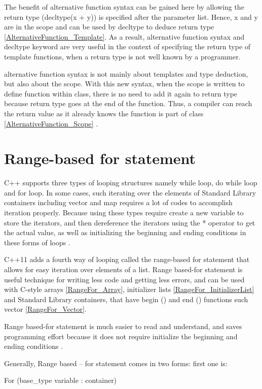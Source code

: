 \documentclass[11pt]{report}
\begin{document}
The benefit of alternative function syntax can be gained here by allowing the return type (decltype(x + y)) is specified after the parameter list. Hence, x and y are in the scope and can be used by decltype to deduce return type \ref{AlternativeFunction_Template}. As a result, alternative function syntax and decltype keyword are very useful in the context of specifying the return type of template functions, when a return type is not well known by a programmer\cite{Prata:2012:Cpp}.


alternative function syntax is not mainly about templates and type deduction, but also about the scope.  With this new syntax, when the scope is written to define function within class, there is no need to add it again to return type because return type goes at the end of the function. Thus, a compiler can reach the return value as it already knows the function is part of class \ref{AlternativeFunction_Scope} \cite{Allain:2011:FutureCpp}.

\section{Range-based for statement}
\label{section: Range-based for statement}
C++ supports three types of looping structures namely while loop, do while loop and for loop. In some cases, such iterating over the elements of Standard Library containers including vector and map requires a lot of codes to accomplish iteration properly. Because using these types require create a new variable to store the iterators, and then dereference the iterators using the * operator to get the actual value, as well as initializing the beginning and ending conditions in these forms of loops \cite{Horstmann:2008:BC}.


C++11 adds a fourth way of looping called the range-based for statement that allows for easy iteration over elements of a list. Range based-for statement is useful technique for writing less code and getting less errors, and can be used with C-style arrays \ref{RangeFor_Array}, initializer lists \ref{RangeFor_InitializerList} and Standard Library containers, that have begin () and end () functions such vector \ref{RangeFor_Vector}. 


Range based-for statement is much easier to read and understand, and saves programming effort because it does not require initialize the beginning and ending conditions \cite{Overland:2011:CWF}.


Generally, Range based – for statement comes in two forms: first one is:
\begin{center}
For (base\_type  variable : container)
\end{center} 
\end{document}
